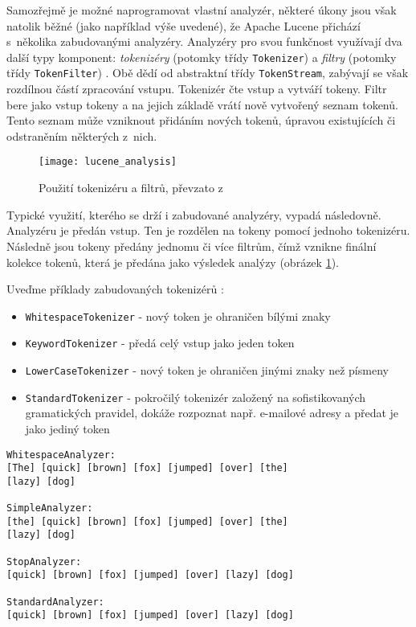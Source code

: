 \documentclass[11pt,oneside]{fithesis2}
\begin{document}
Samozřejmě je možné naprogramovat vlastní analyzér, některé úkony jsou však natolik běžné (jako například výše uvedené), že Apache Lucene přichází s~několika zabudovanými analyzéry. Analyzéry pro svou funkčnost využívají dva další typy komponent: \emph{tokenizéry} (potomky třídy \texttt{Tokenizer}) a \emph{filtry} (potomky třídy \texttt{TokenFilter})  \cite[s.~115]{LuceneAction}. Obě dědí od abstraktní třídy \texttt{TokenStream}, zabývají se však rozdílnou částí zpracování vstupu. Tokenizér čte vstup a vytváří tokeny. Filtr bere jako vstup tokeny a na jejich základě vrátí nově vytvořený seznam tokenů. Tento seznam může vzniknout přidáním nových tokenů, úpravou existujících či odstraněním některých z~nich. 

\begin{figure}[hb]
	\begin{center}
		\texttt{[image: lucene\_analysis]}
	\end{center}
	\caption{Použití tokenizéru a filtrů, převzato z~ \cite[s.~117]{LuceneAction}}	
	\label{AnalysisLucene}
\end{figure}

Typické využití, kterého se drží i zabudované analyzéry, vypadá následovně. Analyzéru je předán vstup. Ten je rozdělen na tokeny pomocí jednoho tokenizéru. Následně jsou tokeny předány jednomu či více filtrům, čímž vznikne finální kolekce tokenů, která je předána jako výsledek analýzy (obrázek \ref{AnalysisLucene}).

Uveďme příklady zabudovaných tokenizérů  \cite[s.~118]{LuceneAction}:

\begin{itemize}
	\item \texttt{WhitespaceTokenizer} - nový token je ohraničen bílými znaky
	\item \texttt{KeywordTokenizer} - předá celý vstup jako jeden token
	\item \texttt{LowerCaseTokenizer} - nový token je ohraničen jinými znaky než písmeny
	\item \texttt{StandardTokenizer} - pokročilý tokenizér založený na sofistikovaných gramatických pravidel, dokáže rozpoznat např. e-mailové adresy a předat je jako jediný token
\end{itemize}

\begin{lstlisting}[caption =  Použití zabudovaných analyzérů pro větu {\emph{\uv{The quick brown fox jumped over the lazy dog}}}{,} převzato z {\cite[str. 111]{LuceneAction}}, label = AnalysisExample1]
WhitespaceAnalyzer:
[The] [quick] [brown] [fox] [jumped] [over] [the] 
[lazy] [dog]

SimpleAnalyzer:
[the] [quick] [brown] [fox] [jumped] [over] [the] 
[lazy] [dog]

StopAnalyzer:
[quick] [brown] [fox] [jumped] [over] [lazy] [dog]

StandardAnalyzer:
[quick] [brown] [fox] [jumped] [over] [lazy] [dog]
\end{lstlisting}
\end{document}
